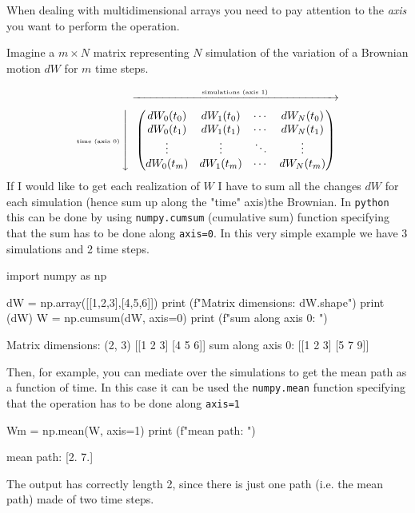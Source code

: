 \documentclass[12pt,a4paper]{book}
\newcommand{\mymatrix}[1]{\ensuremath{\left\downarrow\vphantom{#1}\right.\overset{\xrightarrow[\hphantom{#1}]{\text{simulations (axis 1)}}}{#1}}}
\begin{document}
When dealing with multidimensional arrays you need to pay attention to the \emph{axis} you want to perform the operation.

Imagine a $m\times N$ matrix representing $N$ simulation of the variation of a Brownian motion $dW$ for $m$ time steps.

\begin{equation}
	\text{\tiny time (axis 0)}\mymatrix{\begin{pmatrix}
			dW_0(t_0) & dW_1(t_0) & \cdots & dW_N(t_0) \\
			dW_0(t_1) & dW_1(t_1) & \cdots & dW_N(t_1) \\
			\vdots  & \vdots  & \ddots & \vdots  \\
			dW_0(t_m) & dW_1(t_m) & \cdots & dW_N(t_m)
	\end{pmatrix}}
\label{numpy_array}
\end{equation}
\vfill
If I would like to get each realization of $W$ I have to sum all the changes $dW$ for each simulation (hence sum up along the "time" axis)the Brownian. In \texttt{python} this can be done by using \texttt{numpy.cumsum} (cumulative sum) function specifying that the sum has to be done along \texttt{axis=0}. In this very simple example we have 3 simulations and 2 time steps.
\vfill

\begin{ipython}
import numpy as np

dW = np.array([[1,2,3],[4,5,6]])
print (f"Matrix dimensions: {dW.shape}")
print (dW)
W = np.cumsum(dW, axis=0)
print (f"sum along axis 0: ")
\end{ipython}
\begin{ioutput}
Matrix dimensions: (2, 3)
[[1 2 3]
[4 5 6]]
sum along axis 0: 
[[1 2 3]
[5 7 9]]
\end{ioutput}

Then, for example, you can mediate over the simulations to get the mean path as a function of time. In this case it can be used the \texttt{numpy.mean} function specifying that the operation has to be done along \texttt{axis=1}

\begin{ipython}
Wm = np.mean(W, axis=1)
print (f"mean path: ")
\end{ipython}
\begin{ioutput}
mean path: 
[2. 7.]
\end{ioutput}

The output has correctly length 2, since there is just one path (i.e. the mean path) made of two time steps.
\end{document}

